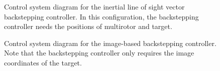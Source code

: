 \begin{figure}[htbp]
	\centering
	\caption{Control system diagram for the inertial line of sight vector backstepping controller. In this configuration, the backstepping controller needs the positions of multirotor and target.}
	\label{system_inertial}
\end{figure}

\begin{figure}[htbp]
	\centering
	\caption{Control system diagram for the image-based backstepping controller. Note that the backstepping controller only requires the image coordinates of the target.}
	\label{system_image}
\end{figure}

